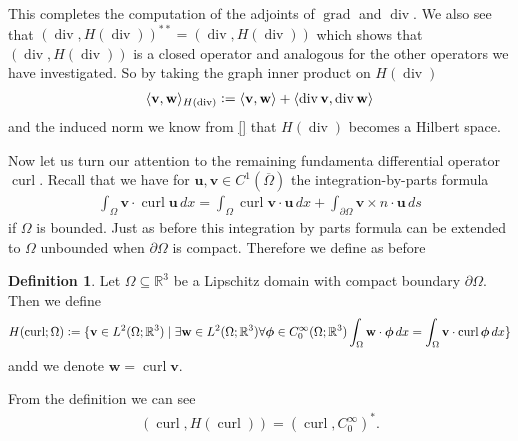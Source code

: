 \documentclass[12pt,a4paper]{article}
\numberwithin{equation}{subsection}
\numberwithin{lemma}{subsection}
\theoremstyle{definition}
\newtheorem{definition}[lemma]{Definition}
\DeclareMathOperator{\curl}{curl}
\DeclareMathOperator{\diver}{div}
\DeclareMathOperator{\grad}{grad}
\newcommand{\real}{\mathbb{R}}
\begin{document}


This completes the computation of the adjoints of $\grad$ and $\diver$. We also 
see that $(\diver, H(\diver))^{**} = (\diver, H(\diver))$ which shows that 
$ (\diver, H(\diver))$ is a closed operator and analogous for the other operators 
we have investigated. So by taking the graph inner product on $H(\diver)$
\begin{align*}
    \langle \mathbf{v}, \mathbf{w} \rangle _{H(\diver)}
    \vcentcolon= \langle \mathbf{v}, \mathbf{w} \rangle + \langle \diver \mathbf{v}, \diver \mathbf{w} \rangle
\end{align*}
and the induced norm
we know from \ref{} that $H(\diver)$ becomes a Hilbert space.

Now let us turn our attention to the remaining fundamenta differential operator 
$\curl$. Recall that we have for 
$\mathbf{u}, \mathbf{v} \in C^1(\overline{\Omega})$ the integration-by-parts 
formula
\begin{align}
    \int_\Omega \mathbf{v} \cdot \curl \mathbf{u} \, dx 
    = \int_\Omega \curl \mathbf{v} \cdot \mathbf{u} \, dx 
        + \int_{\partial \Omega} \mathbf{v} \times n \cdot \mathbf{u} \, ds 
        \label{eq:integration_by_parts_curl_C1} 
\end{align}
if $\Omega$ is bounded. Just as before this integration by parts formula can 
be extended to $\Omega$ unbounded when $\partial \Omega$ is compact. 
Therefore we define as before 
\begin{definition}
    Let $\Omega \subseteq \real^3$ be a Lipschitz domain with compact boundary $\partial \Omega$. 
    Then we define 
    \begin{align*}
        H(\curl;\Omega) \vcentcolon= \{ \mathbf{v} \in L^2(\Omega;\real^3)
        \mid \exists \mathbf{w} \in L^2(\Omega; \real^3) 
        \forall \boldsymbol{\phi} \in C_0^\infty(\Omega;\real^3)
        \int_\Omega \mathbf{w} \cdot \boldsymbol{\phi} \, dx 
        = \int_\Omega \mathbf{v} \cdot \curl \boldsymbol{\phi} \, dx \}
    \end{align*}
    andd we denote $\mathbf{w} = \curl \mathbf{v}$.
\end{definition}
From the definition we can see
\begin{align*}
    (\curl, H(\curl)) = (\curl, C_0^\infty)^*.
\end{align*}
\end{document}
